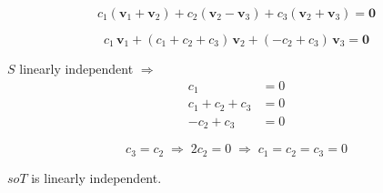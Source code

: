 \documentclass{article}
\begin{document}
\[
c_1(\mathbf{v}_1 + \mathbf{v}_2) + c_2(\mathbf{v}_2 - \mathbf{v}_3) + c_3(\mathbf{v}_2 + \mathbf{v}_3) = \mathbf{0}
\]

\[
c_1\,\mathbf{v}_1 + (c_1 + c_2 + c_3)\,\mathbf{v}_2 + (-c_2 + c_3)\,\mathbf{v}_3 = \mathbf{0}
\]

$S$ linearly independent $\Longrightarrow$
\[
\begin{aligned}
c_1 &= 0 \\
c_1 + c_2 + c_3 &= 0 \\
-c_2 + c_3 &= 0
\end{aligned}
\]

\[
c_3 = c_2 \;\Longrightarrow\; 2c_2 = 0 \;\Longrightarrow\; c_1 = c_2 = c_3 = 0
\]

$so  T$ is linearly independent.
\end{document}
